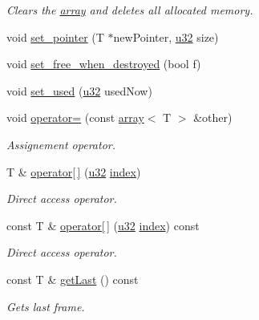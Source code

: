 \begin{CompactItemize}
\begin{CompactList}\small\item\em Clears the \hyperlink{classirr_1_1core_1_1array}{array} and deletes all allocated memory. \item\end{CompactList}\item 
void \hyperlink{classirr_1_1core_1_1array_d0efa8d2ea5078580e5cea1848992a88}{set\_\-pointer} (T $\ast$newPointer, \hyperlink{namespaceirr_0416a53257075833e7002efd0a18e804}{u32} size)
\item 
void \hyperlink{classirr_1_1core_1_1array_0b66cac31609933337fb81bb4a518c8c}{set\_\-free\_\-when\_\-destroyed} (bool f)
\item 
void \hyperlink{classirr_1_1core_1_1array_0767f2095c59d44a73abf4a9fa9480ba}{set\_\-used} (\hyperlink{namespaceirr_0416a53257075833e7002efd0a18e804}{u32} usedNow)
\item 
void \hyperlink{classirr_1_1core_1_1array_a0f0ea56d18bb90eb5c8f286c7273a88}{operator=} (const \hyperlink{classirr_1_1core_1_1array}{array}$<$ T $>$ \&other)
\begin{CompactList}\small\item\em Assignement operator. \item\end{CompactList}\item 
T \& \hyperlink{classirr_1_1core_1_1array_67098e889f4e1f72e442f17dd50cff5f}{operator\mbox{[}$\,$\mbox{]}} (\hyperlink{namespaceirr_0416a53257075833e7002efd0a18e804}{u32} \hyperlink{glext__bak_8h_57f14e05b1900f16a2da82ade47d0c6d}{index})
\begin{CompactList}\small\item\em Direct access operator. \item\end{CompactList}\item 
const T \& \hyperlink{classirr_1_1core_1_1array_db02c1c24954863613a6f2ab0f316bf2}{operator\mbox{[}$\,$\mbox{]}} (\hyperlink{namespaceirr_0416a53257075833e7002efd0a18e804}{u32} \hyperlink{glext__bak_8h_57f14e05b1900f16a2da82ade47d0c6d}{index}) const 
\begin{CompactList}\small\item\em Direct access operator. \item\end{CompactList}\item 
const T \& \hyperlink{classirr_1_1core_1_1array_5424fdabc6ad12f503a15b2c4d7f6b0e}{getLast} () const 
\begin{CompactList}\small\item\em Gets last frame. \item\end{CompactList}\item 

\end{CompactItemize}
